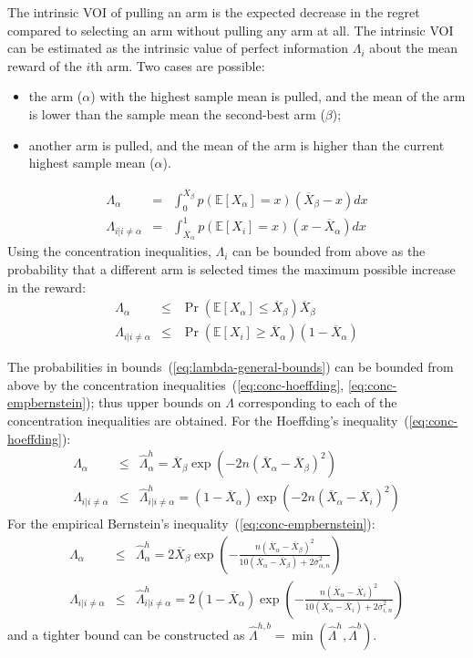 \documentclass{article}
\newcommand {\IE} {\ensuremath {\mathbb{E}}}
\begin{document}
The intrinsic VOI of pulling an arm is the expected decrease
in the regret compared to selecting an arm without pulling any arm at
all. The intrinsic VOI can be estimated as the intrinsic 
value of perfect information $\Lambda_i$ about the mean reward of the $i$th arm. Two
cases are possible:
\begin{itemize}
\item the arm ($\alpha$) with the highest sample mean is pulled, and the 
mean of the arm is lower than the sample mean the second-best arm ($\beta$);
\item another arm is pulled, and the mean of the arm is higher
than the current highest sample mean ($\alpha$).
\end{itemize}
\begin{eqnarray}
\Lambda_\alpha&=&\int_0^{\overline X_\beta}p(\IE[X_\alpha]=x)(\overline X_\beta-x)dx\nonumber\\
\Lambda_{i|i\ne\alpha}&=&\int_{\overline X_\alpha}^1p(\IE[X_i]=x)(x-\overline X_\alpha)dx
\end{eqnarray}
Using the concentration inequalities, $\Lambda_i$ can be bounded from
above as the probability that a different arm is selected times the
maximum possible increase in the reward:
\begin{eqnarray}
\Lambda_\alpha&\le&\Pr(\IE[X_\alpha]\le\overline X_\beta)\overline X_\beta\nonumber\\
\Lambda_{i|i\ne \alpha}&\le&\Pr(\IE[X_i]\ge\overline
X_\alpha)(1-\overline X_\alpha)
\label{eq:lambda-general-bounds}
\end{eqnarray}

The probabilities in bounds~(\ref{eq:lambda-general-bounds}) can be
bounded from above by the concentration
inequalities~(\ref{eq:conc-hoeffding}, \ref{eq:conc-empbernstein});
thus upper bounds on $\Lambda$ corresponding to each of the
concentration inequalities are obtained. For the Hoeffding's
inequality~(\ref{eq:conc-hoeffding}):
\begin{eqnarray}
\Lambda_\alpha&\le&\hat\Lambda_\alpha^h=\overline X_\beta \exp\left(-2n(\overline  X_\alpha - \overline X_\beta)^2\right)\nonumber\\
\Lambda_{i|i\ne \alpha}&\le&\hat\Lambda_{i|i\ne \alpha}^h=(1-\overline X_\alpha) \exp\left(-2n(\overline X_\alpha - \overline X_i)^2\right)
\label{eq:lambda-hoeffding-bounds}
\end{eqnarray}
For the empirical Bernstein's inequality~(\ref{eq:conc-empbernstein}):
\begin{eqnarray}
\Lambda_\alpha&\le&\hat\Lambda_\alpha^h=2\overline X_\beta \exp\left(-\frac {n(\overline X_\alpha - \overline X_\beta)^2} {10(\overline X_\alpha - \overline X_\beta)+2\overline\sigma_{\alpha,n}^2}\right)\nonumber\\
\Lambda_{i|i\ne \alpha}&\le&\hat\Lambda_{i|i\ne \alpha}^h=2(1-\overline X_\alpha) \exp\left(-\frac {n(\overline X_\alpha - \overline X_i)^2} {10(\overline X_\alpha - \overline X_i)+2\overline\sigma_{i,n}^2}\right)
\label{eq:lambda-bernstein-bounds}
\end{eqnarray}
and a tighter bound can be constructed as $\hat\Lambda^{h,b}=\min(\hat\Lambda^h,\hat\Lambda^b)$.
\end{document}
